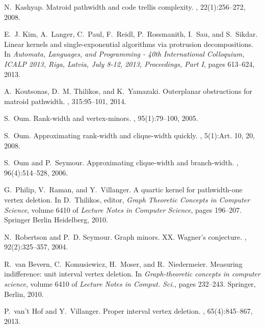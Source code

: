 \documentclass[11pt]{article}
\theoremstyle{remark}
\begin{document}
\begin{thebibliography}{10}
N.~Kashyap.
\newblock Matroid pathwidth and code trellis complexity.
, 22(1):256--272, 2008.

E.~J. Kim, A.~Langer, C.~Paul, F.~Reidl, P.~Rossmanith, I.~Sau, and S.~Sikdar.
\newblock Linear kernels and single-exponential algorithms via protrusion
  decompositions.
\newblock In {\em Automata, Languages, and Programming - 40th International
  Colloquium, {ICALP} 2013, Riga, Latvia, July 8-12, 2013, Proceedings, Part
  {I}}, pages 613--624, 2013.

A.~Koutsonas, D.~M. Thilikos, and K.~Yamazaki.
\newblock Outerplanar obstructions for matroid pathwidth.
, 315:95--101, 2014.

S.~Oum.
\newblock Rank-width and vertex-minors.
, 95(1):79--100, 2005.

S.~Oum.
\newblock Approximating rank-width and clique-width quickly.
, 5(1):Art. 10, 20, 2008.

S.~Oum and P.~Seymour.
\newblock Approximating clique-width and branch-width.
, 96(4):514--528, 2006.

G.~Philip, V.~Raman, and Y.~Villanger.
\newblock A quartic kernel for pathwidth-one vertex deletion.
\newblock In D.~Thilikos, editor, {\em Graph Theoretic Concepts in Computer
  Science}, volume 6410 of {\em Lecture Notes in Computer Science}, pages
  196--207. Springer Berlin Heidelberg, 2010.

N.~Robertson and P.~D. Seymour.
\newblock Graph minors. {XX}. {W}agner's conjecture.
, 92(2):325--357, 2004.

R.~van Bevern, C.~Komusiewicz, H.~Moser, and R.~Niedermeier.
\newblock Measuring indifference: unit interval vertex deletion.
\newblock In {\em Graph-theoretic concepts in computer science}, volume 6410 of
  {\em Lecture Notes in Comput. Sci.}, pages 232--243. Springer, Berlin, 2010.

P.~van't Hof and Y.~Villanger.
\newblock Proper interval vertex deletion.
, 65(4):845--867, 2013.

\end{thebibliography}
\end{document}
